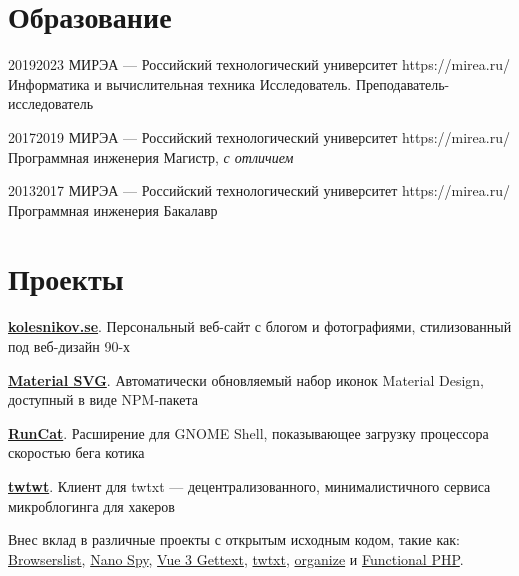 \documentclass[10pt]{article}
\begin{document}
\vspace{-.5\baselineskip}


\section{Образование}

\education
	{2019}{2023}
	{МИРЭА --- Российский технологический университет}
	{https://mirea.ru/}
	{Информатика и вычислительная техника}
	{Исследователь. Преподаватель-исследователь}

\education
	{2017}{2019}
	{МИРЭА --- Российский технологический университет}
	{https://mirea.ru/}
	{Программная инженерия}
	{Магистр, \textit{с отличием}}

\education
	{2013}{2017}
	{МИРЭА --- Российский технологический университет}
	{https://mirea.ru/}
	{Программная инженерия}
	{Бакалавр}


\section{Проекты}

\begin{compactitemize}
	\item \textbf{\href{https://kolesnikov.se/}{kolesnikov.se}}. Персональный веб-сайт с блогом и фотографиями, стилизованный под веб-дизайн 90-х
	\item \textbf{\href{https://github.com/cloudblue/material-svg}{Material SVG}}. Автоматически обновляемый набор иконок Material Design, доступный в виде NPM-пакета
	\item \textbf{\href{https://github.com/win0err/gnome-runcat}{RunCat}}. Расширение для GNOME Shell, показывающее загрузку процессора скоростью бега котика
	\item \textbf{\href{https://github.com/win0err/twtwt}{twtwt}}. Клиент для twtxt --- децентрализованного, минималистичного сервиса микроблогинга для хакеров
\end{compactitemize}

Внес вклад в различные проекты с открытым исходным кодом, такие как:
\href{https://github.com/browserslist/browserslist/pulls?q=author:win0err}{Browserslist},
\href{https://github.com/ai/nanospy/pulls?q=author:win0err}{Nano Spy},
\href{https://github.com/jshmrtn/vue3-gettext/pulls?q=author:win0err}{Vue 3 Gettext},
\href{https://github.com/buckket/twtxt/pulls?q=author:win0err}{twtxt},
\href{https://github.com/tfeldmann/organize/pulls?q=author:win0err}{organize} и \href{https://github.com/lstrojny/functional-php/pulls?q=author:win0err}{Functional PHP}.
\end{document}
